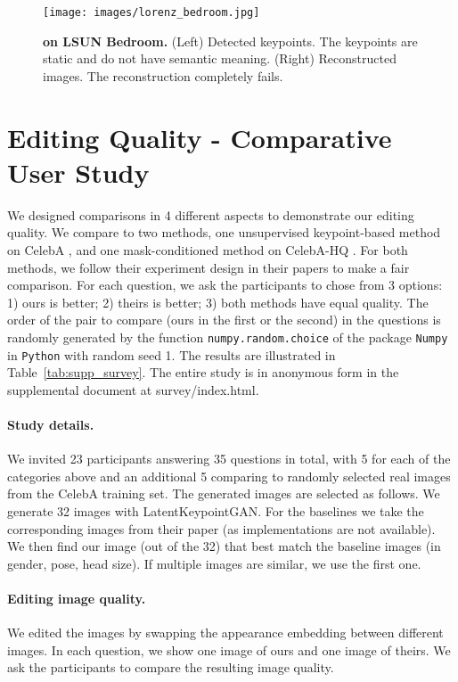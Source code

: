\documentclass[10pt, conference, compsocconf]{IEEEtran}
\begin{document}
\begin{figure*}[t]
\begin{center}
   \texttt{[image: images/lorenz\_bedroom.jpg]}
\end{center}
   \caption{\textbf{\cite{lorenz2019unsupervised} on LSUN Bedroom.} (Left) Detected keypoints. The keypoints are static and do not have semantic meaning. (Right) Reconstructed images. The reconstruction completely fails.}
\label{fig:lorenz_bedroom}
\end{figure*} \section{Editing Quality - Comparative User Study} \label{sec:supp_survey}
We designed comparisons in 4 different aspects to demonstrate our editing quality. We compare to two methods, one unsupervised keypoint-based method \cite{zhang2018unsupervised} on CelebA \cite{liu2015faceattributes}, and one mask-conditioned method \cite{zhu2020sean} on CelebA-HQ \cite{liu2015faceattributes}. For both methods, we follow their experiment design in their papers to make a fair comparison. For each question, we ask the participants to chose from 3 options: 1) ours is better; 2) theirs is better; 3) both methods have equal quality. The order of the pair to compare (ours in the first or the second) in the questions is randomly generated by the function \texttt{numpy.random.choice} of the package \texttt{Numpy} in \texttt{Python} with random seed 1. The results are illustrated in Table~\ref{tab:supp_survey}. The entire study is in anonymous form in the supplemental document at survey/index.html.

\paragraph{Study details.} We invited 23 participants answering 35 questions in total, with 5 for each of the categories above and an additional 5 comparing to randomly selected real images from the CelebA training set. The generated images are selected as follows. We generate 32 images with LatentKeypointGAN. For the baselines we take the corresponding images from their paper (as implementations are not available). We then find our image (out of the 32) that best match the baseline images (in gender, pose, head size). If multiple images are similar, we use the first one. 

\paragraph{Editing image quality.} We edited the images by swapping the appearance embedding between different images. In each question, we show one image of ours and one image of theirs. We ask the participants to compare the resulting image quality. 
\end{document}
